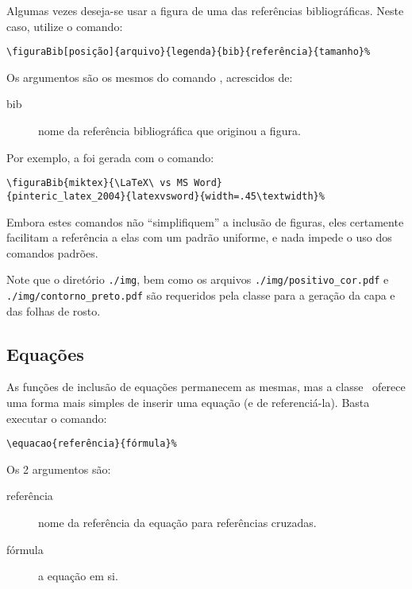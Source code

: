 Algumas vezes deseja-se usar a figura de uma das referências bibliográficas. Neste caso, utilize o 
comando:

\begin{verbatim}
\figuraBib[posição]{arquivo}{legenda}{bib}{referência}{tamanho}%
\end{verbatim}

Os argumentos são os mesmos do comando , acrescidos de:
\begin{description}
	\item[bib] nome da referência bibliográfica que originou a figura.
\end{description}

Por exemplo, a  foi gerada com o comando:
\begin{verbatim}
\figuraBib{miktex}{\LaTeX\ vs MS Word}
{pinteric_latex_2004}{latexvsword}{width=.45\textwidth}%
\end{verbatim}

Embora estes comandos não ``simplifiquem'' a inclusão de figuras, eles certamente facilitam a 
referência a elas com um padrão uniforme, e nada impede o uso dos comandos padrões.

%

Note que o diretório \texttt{./img}, bem como os arquivos \texttt{./img/positivo_cor.pdf} e 
\texttt{./img/contorno_preto.pdf} são requeridos pela classe para a geração da capa e das folhas
de rosto.


\subsection{Equações}
As funções de inclusão de equações permanecem as mesmas, mas a classe \unbene\ oferece uma forma 
mais simples de inserir uma equação (e de referenciá-la). Basta executar o comando:

\begin{verbatim}
\equacao{referência}{fórmula}%
\end{verbatim}

Os 2 argumentos são:
\begin{description}
	\item[referência] nome da referência da equação para referências cruzadas.
	\item[fórmula] a equação em si.
\end{description}


